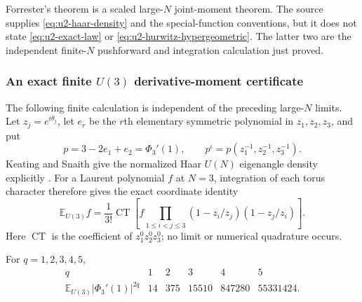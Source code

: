 Forrester's theorem is a scaled large-$N$ joint-moment theorem.  The source supplies
\eqref{eq:u2-haar-density} and the special-function conventions, but it does not state
\eqref{eq:u2-exact-law} or \eqref{eq:u2-hurwitz-hypergeometric}.  The latter two are the
independent finite-$N$ pushforward and integration calculation just proved.

\subsubsection{An exact finite \texorpdfstring{$U(3)$}{U(3)} derivative-moment certificate}

The following finite calculation is independent of the preceding large-$N$ limits.  Let
$z_j=e^{i\theta_j}$, let $e_r$ be the $r$th elementary symmetric polynomial in
$z_1,z_2,z_3$, and put
\begin{equation}
 p=3-2e_1+e_2=\Phi_3'(1),
 \qquad
 p^\iota=p(z_1^{-1},z_2^{-1},z_3^{-1}).
 \label{eq:n3-derivative-coordinate}
\end{equation}
Keating and Snaith give the normalized Haar $U(N)$ eigenangle density explicitly
\cite[Sec.~2.1, eq.~(21)]{keatingSnaith2000}.  For a Laurent polynomial $f$ at $N=3$,
integration of each torus character therefore gives the exact coordinate identity
\begin{equation}
 \mathbb E_{U(3)}f
 =\frac1{3!}\operatorname{CT}\!\left[
 f\prod_{1\le i<j\le3}(1-z_i/z_j)(1-z_j/z_i)
 \right].
 \label{eq:n3-weyl-constant-term}
\end{equation}
Here $\operatorname{CT}$ is the coefficient of $z_1^0z_2^0z_3^0$; no limit or numerical
quadrature occurs.

\begin{proposition}
\label{prop:n3-cue-exact-moments}
For $q=1,2,3,4,5$,
\begin{equation}
\begin{array}{c|rrrrr}
 q&1&2&3&4&5\\ \hline
 \mathbb E_{U(3)}|\Phi_3'(1)|^{2q}
 &14&375&15510&847280&55331424.
\end{array}
\label{eq:n3-cue-exact-moments}
\end{equation}
\end{proposition}

